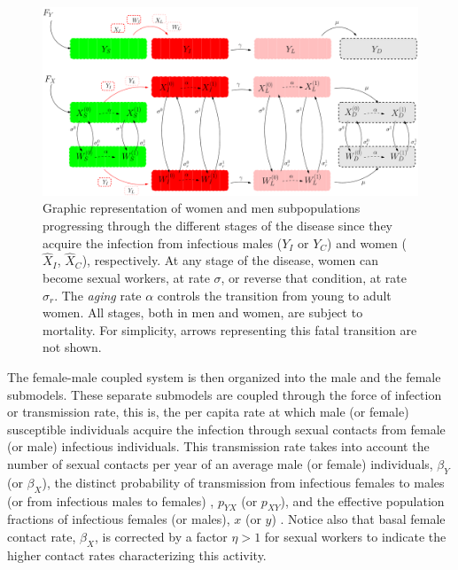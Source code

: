 \documentclass[preprint,12pt]{elsarticle}
\begin{document}
\begin{figure}
\centering\includegraphics[width=1.0\linewidth,angle=0]{HIV_Fig1_Full}
\caption{\label{Fig:1} Graphic representation of women and men subpopulations progressing through the different stages of the disease since they acquire the infection from infectious males ($Y_I$ or $Y_C$) and women ($\hat{X}_I$, $\hat{X}_C$), respectively. At any stage of the disease, women can become sexual workers, at rate $\sigma$, or reverse that condition, at rate $\sigma_r$. The {\em aging} rate $\alpha$ controls the transition from young to adult women. All stages, both in men and women, are subject to mortality. For simplicity, arrows representing this fatal transition are not shown.}
\end{figure}

The female-male coupled system is then organized into the male and the female submodels. These separate submodels are coupled through the force of infection or transmission rate, this is, the per capita rate at which male (or female) susceptible individuals acquire the infection through sexual contacts from female (or male) infectious individuals. This transmission rate takes into account the number of sexual contacts per year of an average male (or female) individuals, $\beta_Y$ (or $\beta_X$), the distinct probability of transmission from infectious females to males (or from infectious males to females) \cite{Hollingsworth2008}, $p_{YX}$ (or $p_{XY}$), and the effective population fractions of infectious females (or males), $x$ (or $y$) \cite{McCallum2001}. Notice also that basal female contact rate, $\beta_X$, is corrected by a factor $\eta > 1$ for sexual workers to indicate the higher contact rates characterizing this activity. 
\smallskip
\end{document}
